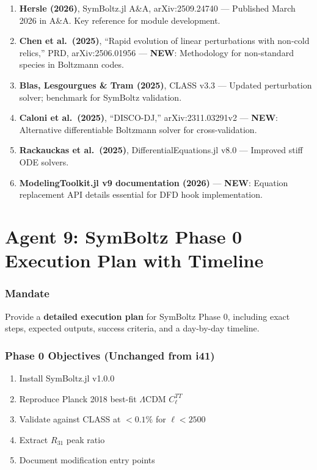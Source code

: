 \documentclass[11pt,a4paper]{article}
\newcommand{\NEW}{\textcolor{dfdblue}{\textbf{NEW}}}
\begin{document}
\begin{enumerate}
\item \textbf{Hersle (2026)}, SymBoltz.jl A\&A, arXiv:2509.24740 --- Published March 2026 in A\&A. Key reference for module development.

\item \textbf{Chen et al.\ (2025)}, ``Rapid evolution of linear perturbations with non-cold relics,'' PRD, arXiv:2506.01956 --- \NEW: Methodology for non-standard species in Boltzmann codes.

\item \textbf{Blas, Lesgourgues \& Tram (2025)}, CLASS v3.3 --- Updated perturbation solver; benchmark for SymBoltz validation.

\item \textbf{Caloni et al.\ (2025)}, ``DISCO-DJ,'' arXiv:2311.03291v2 --- \NEW: Alternative differentiable Boltzmann solver for cross-validation.

\item \textbf{Rackauckas et al.\ (2025)}, DifferentialEquations.jl v8.0 --- Improved stiff ODE solvers.

\item \textbf{ModelingToolkit.jl v9 documentation (2026)} --- \NEW: Equation replacement API details essential for DFD hook implementation.
\end{enumerate}


\part{Agent 9: SymBoltz Phase 0 Execution Plan with Timeline}
\label{part:agent9}

\section{Mandate}

Provide a \textbf{detailed execution plan} for SymBoltz Phase 0, including exact steps, expected outputs, success criteria, and a day-by-day timeline.

\section{Phase 0 Objectives (Unchanged from i41)}

\begin{enumerate}
\item Install SymBoltz.jl v1.0.0
\item Reproduce Planck 2018 best-fit $\Lambda$CDM $C_\ell^{TT}$
\item Validate against CLASS at $< 0.1\%$ for $\ell < 2500$
\item Extract $R_{31}$ peak ratio
\item Document modification entry points
\end{enumerate}
\end{document}
